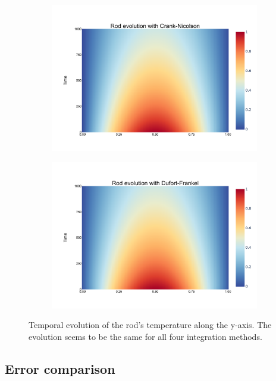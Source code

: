 \documentclass[
	a4paper, %
	10pt, %
]{CSUniSchoolLabReport}
\begin{document}
\begin{figure}[H]
\begin{subfigure}[b]{0.49\textwidth}
	\end{subfigure}
	\hfill
	\begin{subfigure}[b]{0.49\textwidth}
		\includegraphics[width=\textwidth]{../saves_t2/rod_crank-nic.pdf}
	\end{subfigure}
	\hfill
	\begin{subfigure}[b]{0.49\textwidth}
		\includegraphics[width=\textwidth]{../saves_t2/rod_dufort_frankel.pdf}
	\end{subfigure}
	\hfill
	\caption{Temporal evolution of the rod's temperature along the y-axis. The evolution seems to be the same for all four integration methods.}
\end{figure}

\subsection{Error comparison}
\end{document}
